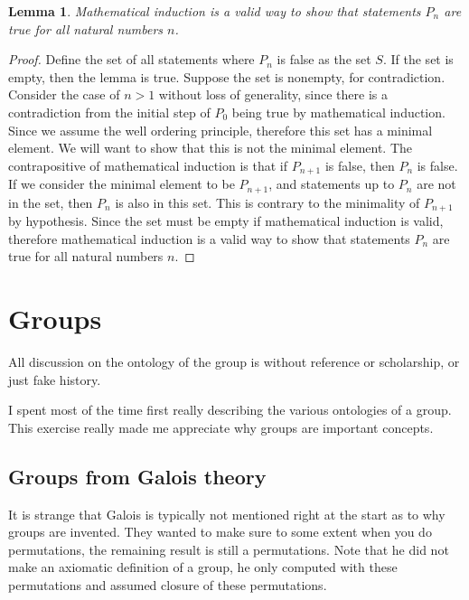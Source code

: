 \documentclass{tufte-book}
\newtheorem{lemma}[theorem]{Lemma}
\begin{document}
\begin{lemma}
  Mathematical induction is a valid way to show that statements $P_n$ are true for all natural numbers $n$.
\end{lemma}

\begin{proof}
  Define the set of all statements where $P_n$ is false as the set $S$. If the set is empty, then the lemma is true.
  Suppose the set is nonempty, for contradiction.
  Consider the case of $n > 1$ without loss of generality, since there is a contradiction from the initial step of $P_0$ being true 
  by mathematical induction.
  Since we assume the well ordering principle, therefore this set has a minimal element.
  We will want to show that this is not the minimal element.
  The contrapositive of mathematical induction is that if $P_{n+1}$ is false, then $P_{n}$ is false.
  If we consider the minimal element to be $P_{n+1}$, and statements up to $P_{n}$ are not in the set, then $P_{n}$ is also in this set.
  This is contrary to the minimality of $P_{n+1}$ by hypothesis.
  Since the set must be empty if mathematical induction is valid, therefore mathematical induction is a valid way to show that statements $P_n$ are true for all natural numbers $n$.
\end{proof}

\chapter{Groups}
\label{ch:group}

All discussion on the ontology of the group is without reference or scholarship, or just fake history.

I spent most of the time first really describing the various ontologies of a group. This exercise really made me appreciate why groups are important concepts.

\section{Groups from Galois theory}\label{sec:groupsgalois}

It is strange that Galois is typically not mentioned right at the start as to why groups are invented. They wanted to make sure to some extent when you do permutations, the remaining result is still a permutations. Note that he did not make an axiomatic definition of a group, he only computed with these permutations and assumed closure of these permutations.
\end{document}
